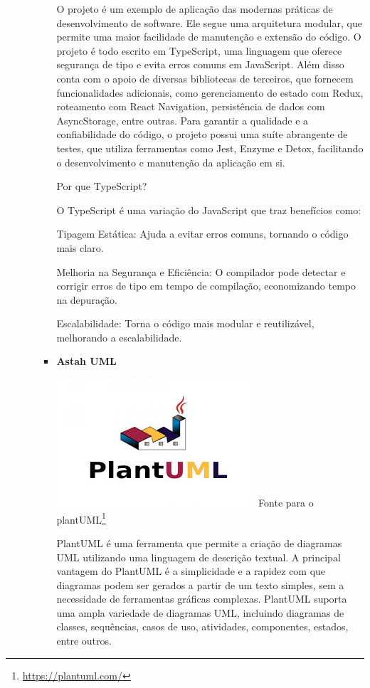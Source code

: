 \begin{itemize}
\begin{itemize}
\begin{itemize}
O projeto é um exemplo de aplicação das modernas práticas de desenvolvimento de software. Ele segue uma arquitetura modular, que permite uma maior facilidade de manutenção e extensão do código. O projeto é todo escrito em TypeScript, uma linguagem que oferece segurança de tipo e evita erros comuns em JavaScript.
Além disso conta com o apoio de diversas bibliotecas de terceiros, que fornecem funcionalidades adicionais, como gerenciamento de estado com Redux, roteamento com React Navigation, persistência de dados com AsyncStorage, entre outras. Para garantir a qualidade e a confiabilidade do código, o projeto possui uma suíte abrangente de testes, que utiliza ferramentas como Jest, Enzyme e Detox, facilitando o desenvolvimento e manutenção da aplicação em si.

Por que TypeScript?

    O TypeScript é uma variação do JavaScript que traz benefícios como:

    Tipagem Estática: Ajuda a evitar erros comuns, tornando o código mais claro.

    Melhoria na Segurança e Eficiência: O compilador pode detectar e corrigir erros de tipo em tempo de compilação, economizando tempo na depuração.

    Escalabilidade: Torna o código mais modular e reutilizável, melhorando a escalabilidade.

    \item \textbf{Astah UML}
    \begin{center}
    \includegraphics[width=0.5\linewidth]{figuras/Tecnologies/plantUML.jpeg}
    \label{fig:Astah UML}
    Fonte para o plantUML\footnote{\url{https://plantuml.com/}}
\end{center}

PlantUML é uma ferramenta que permite a criação de diagramas UML utilizando uma linguagem de descrição textual. A principal vantagem do PlantUML é a simplicidade e a rapidez com que diagramas podem ser gerados a partir de um texto simples, sem a necessidade de ferramentas gráficas complexas. PlantUML suporta uma ampla variedade de diagramas UML, incluindo diagramas de classes, sequências, casos de uso, atividades, componentes, estados, entre outros.


\end{itemize}
\end{itemize}
\end{itemize}
